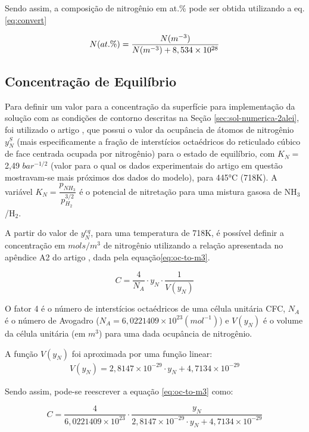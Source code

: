 Sendo assim, a composição de nitrogênio em at.\% pode ser obtida utilizando a eq.\autoref{eq:convert}

\begin{equation}
\label{eq:convert}
	N(at.\%) = \dfrac{N(m^{-3})}{N(m^{-3}) + 8,534 \times 10^{28}\\  } 
\end{equation}

\subsection{Concentração de Equilíbrio}
\label{sec:ceq-param}
Para definir um valor para a concentração da superfície para implementação da solução com as condições de contorno descritas na Seção \autoref{sec:sol-numerica-2alei}, foi utilizado o artigo  \cite{christiansen2008nitrogen}, que possui o valor da ocupância de átomos de nitrogênio $y_N^{S}$ (mais especificamente a fração de interstícios octaédricos do reticulado cúbico de face centrada ocupada por nitrogênio) para o estado de equilíbrio, com $K_N=$2,49 $bar^{-1/2}$ (valor para o qual os dados experimentais do artigo em questão mostravam-se mais próximos dos dados do modelo), para 445°C (718K). A variável $K_N=\dfrac{p_{NH_3}}{p_{H_2}^{3/2}}$ é o potencial de nitretação para uma mistura gasosa de NH$_3$/H$_2$.

A partir do valor de $y_N^{eq}$, para uma temperatura de 718K, é possível definir a concentração em $mols/m^3$ de nitrogênio utilizando a relação apresentada no apêndice A2 do artigo \cite{jespersen2016modelling}, dada pela equação\autoref{eq:oc-to-m3}.

\begin{equation} \label{eq:oc-to-m3}
	C = \dfrac{4}{N_A} \cdot y_N \cdot \dfrac{1}{V(y_N)}
\end{equation}

O fator 4 é o número de interstícios octaédricos de uma célula unitária CFC, $N_A$ é o número de Avogadro ($N_A = 6,0221409 \times 10^{23} (mol^{-1})$) e $V(y_N)$ é o volume da célula unitária (em $m^3$) para uma dada ocupância de nitrogênio.

A função $V(y_N)$ foi aproximada por uma função linear: 
\begin{gather*}
	V(y_N) = 2,8147 \times 10^{-29} \cdot y_N + 4,7134 \times 10^{-29}
\end{gather*}

Sendo assim, pode-se reescrever a equação \autoref{eq:oc-to-m3} como:

\begin{equation} \label{eq:oc-to-m3-full}
	C = \dfrac{4}{6,0221409 \times 10^{23}} \cdot \dfrac{y_N}{2,8147 \times 10^{-29} \cdot y_N + 4,7134 \times 10^{-29}}
\end{equation}

